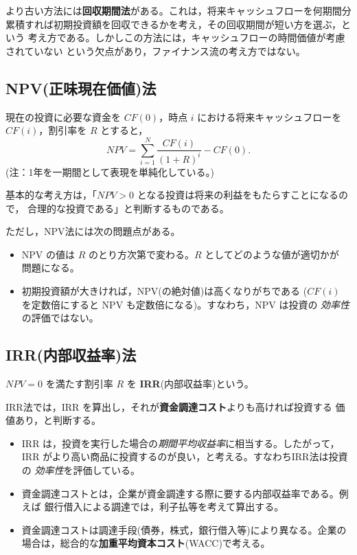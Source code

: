より古い方法には\textbf{回収期間法}がある。これは，将来キャッシュフローを何期間分
累積すれば初期投資額を回収できるかを考え，その回収期間が短い方を選ぶ，という
考え方である。しかしこの方法には，キャッシュフローの時間価値が考慮されていない
という欠点があり，ファイナンス流の考え方ではない。

\subsection{NPV(正味現在価値)法}

\begin{definition}[NPV]
現在の投資に必要な資金を $CF(0)$，時点 $i$ における将来キャッシュフローを
$CF(i)$，割引率を $R$ とすると，
\begin{equation}
NPV = \sum_{i=1}^{N}\frac{CF(i)}{(1+R)^i} - CF(0).
\label{eq:npv}
\end{equation}
(注：1年を一期間として表現を単純化している。)
\end{definition}

基本的な考え方は，「$NPV > 0$ となる投資は将来の利益をもたらすことになるので，
合理的な投資である」と判断するものである。

ただし，NPV法には次の問題点がある。
\begin{itemize}
\item NPV の値は $R$ のとり方次第で変わる。$R$ としてどのような値が適切かが
問題になる。
\item 初期投資額が大きければ，NPV(の絶対値)は高くなりがちである
($CF(i)$ を定数倍にすると NPV も定数倍になる)。すなわち，NPV は投資の
\emph{効率性}の評価ではない。
\end{itemize}

\subsection{IRR(内部収益率)法}

\begin{definition}[IRR]
$NPV = 0$ を満たす割引率 $R$ を \textbf{IRR}(内部収益率)という。
\end{definition}

IRR法では，IRR を算出し，それが\textbf{資金調達コスト}よりも高ければ投資する
価値あり，と判断する。

\begin{itemize}
\item IRR は，投資を実行した場合の\emph{期間平均収益率}に相当する。したがって，
IRR がより高い商品に投資するのが良い，と考える。すなわちIRR法は投資の
\emph{効率性}を評価している。
\item 資金調達コストとは，企業が資金調達する際に要する内部収益率である。例えば
銀行借入による調達では，利子払等を考えて算出する。
\item 資金調達コストは調達手段(債券，株式，銀行借入等)により異なる。企業の
場合は，総合的な\textbf{加重平均資本コスト}(WACC)で考える。
\end{itemize}

